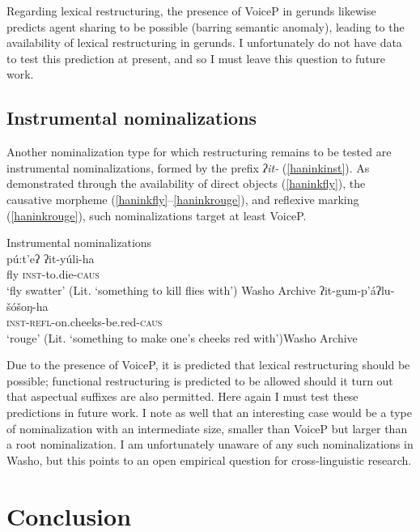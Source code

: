 \documentclass[output=paper]{langscibook}
\begin{document}
Regarding lexical restructuring, the presence of VoiceP in gerunds likewise predicts agent sharing to be possible (barring semantic anomaly), leading to the availability of lexical restructuring in gerunds. I unfortunately do not have data to test this prediction at present, and so I must leave this question to future work.


\subsection{Instrumental nominalizations}

Another nominalization type for which restructuring remains to be tested are instrumental nominalizations, formed by the prefix {\itshape ʔit-} (\ref{haninkinst}). As demonstrated through the availability of direct objects (\ref{haninkfly}), the causative morpheme (\ref{haninkfly}--\ref{haninkrouge}), and reflexive marking (\ref{haninkrouge}), such nominalizations target at least VoiceP.
 
\ea Instrumental nominalizations\label{haninkinst}\\
\ea \gll pú:t'eʔ ʔit-yúli-ha\\
fly {\scshape inst}-to.die-{\scshape caus}\\
\glt `fly swatter' (Lit. `something to kill flies with') \hfill Washo Archive \label{haninkfly}
\ex \gll ʔit-gum-p'áʔlu-šóšoŋ-ha\\
{\scshape inst-refl}-on.cheeks-be.red-{\scshape caus}\\
\glt `rouge'   (Lit. `something to make one's cheeks red with')\newline\phantom{x}\hfill Washo Archive \label{haninkrouge}
\z
\z
 
Due to the presence of VoiceP, it is predicted that lexical restructuring should be possible; functional restructuring is predicted to be allowed should it turn out that aspectual suffixes are also permitted. Here again I must test these predictions in future work. I note as well that an interesting case would be a type of nominalization with an intermediate size, smaller than VoiceP but larger than a root nominalization. I am unfortunately unaware of any such nominalizations in Washo, but this points to an  open empirical question for cross-linguistic research. 

 \section{Conclusion}
 
\end{document}
